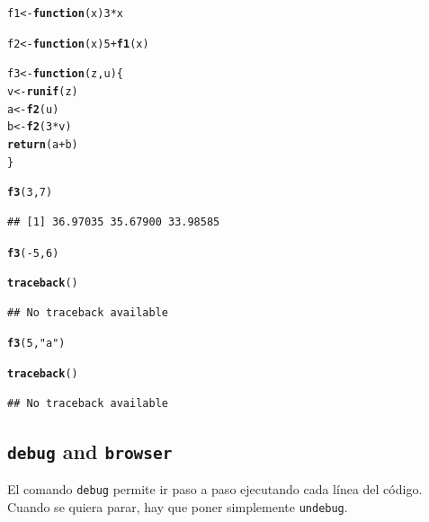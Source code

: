 \documentclass{config/apuntes}\usepackage[]{graphicx}\usepackage[]{xcolor}
\makeatletter
\newcommand{\hlnum}[1]{\textcolor[rgb]{0.686,0.059,0.569}{#1}}%
\newcommand{\hlsng}[1]{\textcolor[rgb]{0.192,0.494,0.8}{#1}}%
\newcommand{\hlopt}[1]{\textcolor[rgb]{0,0,0}{#1}}%
\newcommand{\hldef}[1]{\textcolor[rgb]{0.345,0.345,0.345}{#1}}%
\newcommand{\hlkwa}[1]{\textcolor[rgb]{0.161,0.373,0.58}{\textbf{#1}}}%
\newcommand{\hlkwb}[1]{\textcolor[rgb]{0.69,0.353,0.396}{#1}}%
\newcommand{\hlkwc}[1]{\textcolor[rgb]{0.333,0.667,0.333}{#1}}%
\newcommand{\hlkwd}[1]{\textcolor[rgb]{0.737,0.353,0.396}{\textbf{#1}}}%
\newenvironment{kframe}{%
 \def\at@end@of@kframe{}%
 \ifinner\ifhmode%
  \def\at@end@of@kframe{\end{minipage}}%
  \begin{minipage}{\columnwidth}%
 \fi\fi%
 \def\FrameCommand##1{\hskip\@totalleftmargin \hskip-\fboxsep
 \colorbox{shadecolor}{##1}\hskip-\fboxsep
     \hskip-\linewidth \hskip-\@totalleftmargin \hskip\columnwidth}%
 \MakeFramed {\advance\hsize-\width
   \@totalleftmargin\z@ \linewidth\hsize
   \@setminipage}}%
 {\par\unskip\endMakeFramed%
 \at@end@of@kframe}
\newenvironment{knitrout}{}{} %
\newcommand{\code}[1]{\texttt{#1}}
\makeatother
\begin{document}
\begin{knitrout}
\color{fgcolor}\begin{kframe}
\begin{alltt}
\hldef{f1} \hlkwb{<-} \hlkwa{function}\hldef{(}\hlkwc{x}\hldef{)} \hlnum{3} \hlopt{*} \hldef{x}

\hldef{f2} \hlkwb{<-} \hlkwa{function}\hldef{(}\hlkwc{x}\hldef{)} \hlnum{5} \hlopt{+} \hlkwd{f1}\hldef{(x)}

\hldef{f3} \hlkwb{<-} \hlkwa{function}\hldef{(}\hlkwc{z}\hldef{,} \hlkwc{u}\hldef{) \{}
    \hldef{v} \hlkwb{<-} \hlkwd{runif}\hldef{(z)}
    \hldef{a} \hlkwb{<-} \hlkwd{f2}\hldef{(u)}
    \hldef{b} \hlkwb{<-} \hlkwd{f2}\hldef{(}\hlnum{3} \hlopt{*} \hldef{v)}
    \hlkwd{return}\hldef{(a} \hlopt{+} \hldef{b)}
\hldef{\}}

\hlkwd{f3}\hldef{(}\hlnum{3}\hldef{,} \hlnum{7}\hldef{)}
\end{alltt}
\begin{verbatim}
## [1] 36.97035 35.67900 33.98585
\end{verbatim}
\begin{alltt}
\hlkwd{f3}\hldef{(}\hlopt{-}\hlnum{5}\hldef{,} \hlnum{6}\hldef{)}
\end{alltt}


{\ttfamily\noindent\bfseries\color{errorcolor}{\#\# Error in runif(z): invalid arguments}}\begin{alltt}
\hlkwd{traceback}\hldef{()}
\end{alltt}
\begin{verbatim}
## No traceback available
\end{verbatim}
\begin{alltt}
\hlkwd{f3}\hldef{(}\hlnum{5}\hldef{,} \hlsng{"a"}\hldef{)}
\end{alltt}


{\ttfamily\noindent\bfseries\color{errorcolor}{\#\# Error in 3 * x: argumento no-numérico para operador binario}}\begin{alltt}
\hlkwd{traceback}\hldef{()}
\end{alltt}
\begin{verbatim}
## No traceback available
\end{verbatim}
\end{kframe}
\end{knitrout}

\subsection{\code{debug} and \code{browser}}
El comando \code{debug} permite ir paso a paso ejecutando cada línea del código. Cuando se quiera parar, hay que poner simplemente \code{undebug}.
\end{document}
